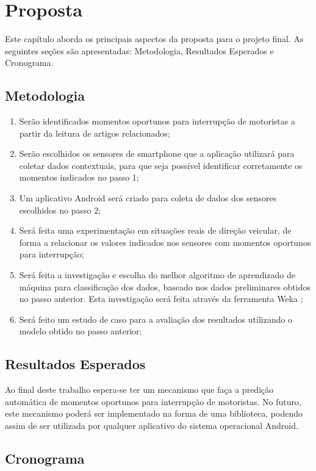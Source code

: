 \chapter{Proposta}
\label{proposta}
Este capítulo aborda os principais aspectos da proposta para o projeto final. As seguintes seções são apresentadas:
Metodologia, Resultados Esperados e Cronograma.

\section{Metodologia}
\label{metodologia}

\begin{enumerate}
  \item Serão identificados momentos oportunos para interrupção de motoristas a partir da leitura de artigos
relacionados;
  \item Serão escolhidos os sensores de smartphone que a aplicação utilizará para coletar dados contextuais, para
que seja possível identificar corretamente os momentos indicados no passo 1;
  \item Um aplicativo Android será criado para coleta de dados dos sensores escolhidos no passo 2;
  \item Será feita uma experimentação em situações reais de direção veicular, de forma a relacionar os valores indicados
nos sensores com momentos oportunos para interrupção;
  \item Será feita a investigação e escolha do melhor algoritmo de aprendizado de máquina para classificação dos dados,
baseado nos dados preliminares obtidos no passo anterior. Esta investigação será feita através da ferramenta Weka
\cite{hall2009weka};
  \item Será feito um estudo de caso para a avaliação dos resultados utilizando o modelo obtido no passo anterior;
\end{enumerate}

\section{Resultados Esperados}
\label{resultados}

Ao final deste trabalho espera-se ter um mecanismo que faça a predição automática de momentos oportunos para
interrupção de motoristas. No futuro, este mecanismo poderá ser implementado na forma de uma biblioteca, podendo assim
de ser utilizada por qualquer aplicativo do sistema operacional Android.

\section{Cronograma}
\label{cronograma}

